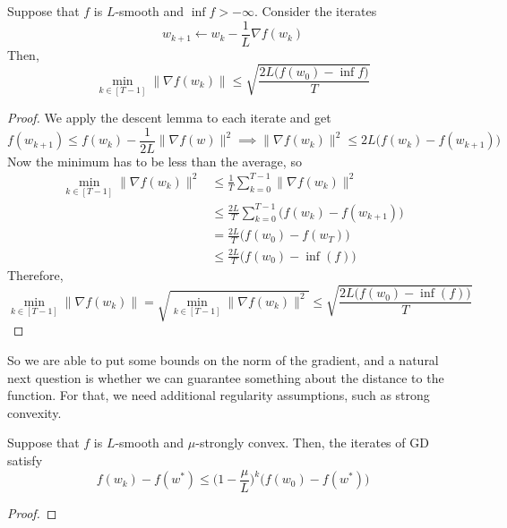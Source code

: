 	\begin{theorem}
		\label{thm:convergence_to_criticality_gd}
		Suppose that $f$ is $L$-smooth and $\inf{f} > -\infty$. Consider the iterates 
		\begin{equation}
			w_{k+1} \gets w_k - \frac{1}{L} \nabla f(w_k)
		\end{equation}
		Then, 
		\begin{equation}
			\min_{k \in [T - 1]} \|\nabla f(w_k) \| \leq \sqrt{ \frac{2L \big( f(w_0) - \inf{f} \big)}{T}}
		\end{equation}
	\end{theorem}
	\begin{proof}
		We apply the descent lemma to each iterate and get 
		\begin{equation}
			f(w_{k+1}) \leq f(w_k) - \frac{1}{2L} \|\nabla f(w)\|^2 \implies \|\nabla f(w_k)\|^2 \leq 2L \big( f(w_k) - f(w_{k+1}) \big)
		\end{equation}
		Now the minimum has to be less than the average, so 
		\begin{align}
			\min_{k \in [T - 1]} \|\nabla f(w_k)\|^2 & \leq \frac{1}{T} \sum_{k=0}^{T-1} \|\nabla f(w_k) \|^2 \\ 
																							 & \leq \frac{2L}{T} \sum_{k=0}^{T-1} \big( f(w_k) - f(w_{k+1}) \big) \\ 
																							 & = \frac{2L}{T} \big( f(w_0) - f(w_T) \big) \\ 
																							 & \leq \frac{2L}{T} \big( f(w_0) - \inf(f) \big)  
		\end{align}
		Therefore, 
		\begin{equation}
			\min_{k \in [T-1]} \|\nabla f(w_k) \| = \sqrt{\min_{k \in [T-1]} \|\nabla f(w_k) \|^2} \leq \sqrt{\frac{2L \big( f(w_0) - \inf(f) \big)}{T}}
		\end{equation}
	\end{proof}

	So we are able to put some bounds on the norm of the gradient, and a natural next question is whether we can guarantee something about the distance to the function. For that, we need additional regularity assumptions, such as strong convexity. 

	\begin{theorem}
	  Suppose that $f$ is $L$-smooth and $\mu$-strongly convex. Then, the iterates of GD satisfy 
		\begin{equation}
			f(w_k) - f(w^\ast) \leq \bigg( 1 - \frac{\mu}{L} \bigg)^k \big( f(w_0) - f(w^\ast) \big) 
		\end{equation}
	\end{theorem}
	\begin{proof}
	  
	\end{proof}

